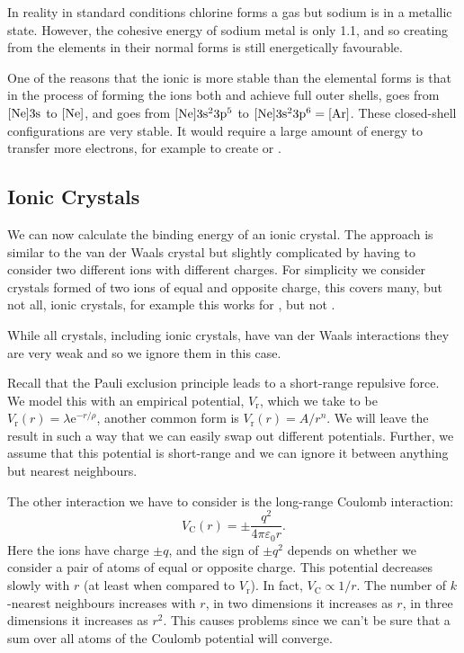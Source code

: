 \documentclass[fleqn]{NotesClass}
\newcommand*{\e}{\mathrm{e}}
\begin{document}
    In reality in standard conditions chlorine forms a gas but sodium is in a metallic state.
    However, the cohesive energy of sodium metal is only \qty{1.1}{\eVperAtom}, and so creating  from the elements in their normal forms is still energetically favourable.
    
    One of the reasons that the ionic  is more stable than the elemental forms is that in the process of forming the ions both  and  achieve full outer shells,  goes from \(\mathrm{[\ce{Ne}]3s}\) to \(\mathrm{[\ce{Ne}]}\), and  goes from \(\mathrm{[\ce{Ne}]3s^23p^5}\) to \(\mathrm{[\ce{Ne}]3s^23p^6} = \mathrm{[\ce{Ar}]}\).
    These closed-shell configurations are very stable.
    It would require a large amount of energy to transfer more electrons, for example to create  or .
    
    \subsection{Ionic Crystals}
    We can now calculate the binding energy of an ionic crystal.
    The approach is similar to the van der Waals crystal but slightly complicated by having to consider two different ions with different charges.
    For simplicity we consider crystals formed of two ions of equal and opposite charge, this covers many, but not all, ionic crystals, for example this works for , but not .
    
    While all crystals, including ionic crystals, have van der Waals interactions they are very weak and so we ignore them in this case.
    
    Recall that the Pauli exclusion principle leads to a short-range repulsive force.
    We model this with an empirical potential, \(V_{\mathrm{r}}\), which we take to be \(V_{\mathrm{r}}(r) = \lambda\e^{-r/\rho}\), another common form is \(V_{\mathrm{r}}(r) = A/r^{n}\).
    We will leave the result in such a way that we can easily swap out different potentials.
    Further, we assume that this potential is short-range and we can ignore it between anything but nearest neighbours.
    
    The other interaction we have to consider is the long-range Coulomb interaction:
    \begin{equation}
        V_{\mathrm{C}}(r) = \pm \frac{q^2}{4\pi \varepsilon_0 r}.
    \end{equation}
    Here the ions have charge \(\pm q\), and the sign of \(\pm q^2\) depends on whether we consider a pair of atoms of equal or opposite charge.
    This potential decreases slowly with \(r\) (at least when compared to \(V_{\mathrm{r}}\)).
    In fact, \(V_{\mathrm{C}} \propto 1/r\).
    The number of \(k\)-nearest neighbours increases with \(r\), in two dimensions it increases as \(r\), in three dimensions it increases as \(r^2\).
    This causes problems since we can't be sure that a sum over all atoms of the Coulomb potential will converge.
    
\end{document}

